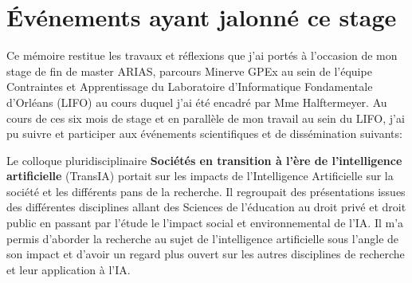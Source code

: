 \section{Événements ayant jalonné ce stage}


    Ce mémoire restitue les travaux et réflexions que j'ai portés à l'occasion de mon stage de fin de master ARIAS, parcours Minerve GPEx au sein de l'équipe Contraintes et Apprentissage du Laboratoire d'Informatique Fondamentale d'Orléans (LIFO) au cours duquel j'ai été encadré par Mme Halftermeyer. Au cours de ces six mois de stage et en parallèle de mon travail au sein du LIFO, j'ai pu suivre et participer aux événements scientifiques et de dissémination suivants:
    
    Le colloque pluridisciplinaire \textbf{Sociétés en transition à l'ère de l'intelligence artificielle} (TransIA) portait sur les impacts de l'Intelligence Artificielle sur la société et les différents pans de la recherche. Il regroupait des présentations issues des différentes disciplines allant des Sciences de l'éducation au droit privé et droit public en passant par l'étude le l'impact social et environnemental de l'IA. Il m'a permis d'aborder la recherche au sujet de l'intelligence artificielle sous l'angle de son impact et d'avoir un regard plus ouvert sur les autres disciplines de recherche et leur application à l'IA. 

